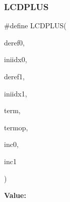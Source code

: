 \subsubsection{\texorpdfstring{LCDPLUS}{LCDPLUS}}
{\footnotesize\ttfamily \#define L\+C\+D\+P\+L\+US(\begin{DoxyParamCaption}\item[{}]{deref0,  }\item[{}]{iniidx0,  }\item[{}]{deref1,  }\item[{}]{iniidx1,  }\item[{}]{term,  }\item[{}]{termop,  }\item[{}]{inc0,  }\item[{}]{inc1 }\end{DoxyParamCaption})}

{\bfseries Value\+:}
\begin{DoxyCode}{0}

\end{DoxyCode}
